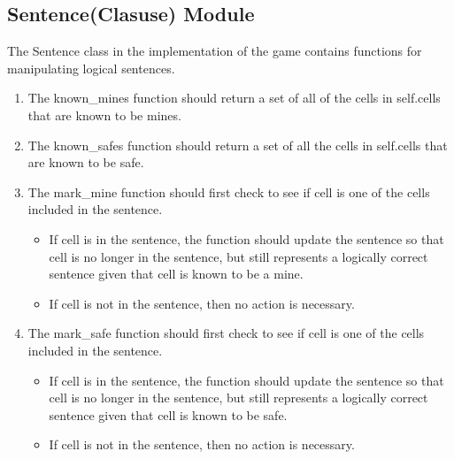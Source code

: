 \documentclass{article} %
\begin{document}
\subsection*{Sentence(Clasuse) Module}
The Sentence class in the implementation of the game contains functions for manipulating logical sentences.
\begin{enumerate}[noitemsep,topsep=0pt]
\item The known\_mines function should return a set of all of the cells in self.cells that are known to be mines. \\
\item The known\_safes function should return a set of all the cells in self.cells that are known to be safe. \\
\item The mark\_mine function should first check to see if cell is one of the cells included in the sentence. \\
\begin{itemize}[noitemsep,topsep=0pt]
\item If cell is in the sentence, the function should update the sentence so that cell is no longer in the sentence, but still represents a logically correct sentence given that cell is known to be a mine. \\
\item If cell is not in the sentence, then no action is necessary. \\
\end{itemize}
\item The mark\_safe function should first check to see if cell is one of the cells included in the sentence. \\
\begin{itemize}[noitemsep,topsep=0pt]
\item If cell is in the sentence, the function should update the sentence so that cell is no longer in the sentence, but still represents a logically correct sentence given that cell is known to be safe. \\
\item If cell is not in the sentence, then no action is necessary. \\
\end{itemize}
\end{enumerate}
\end{document}
